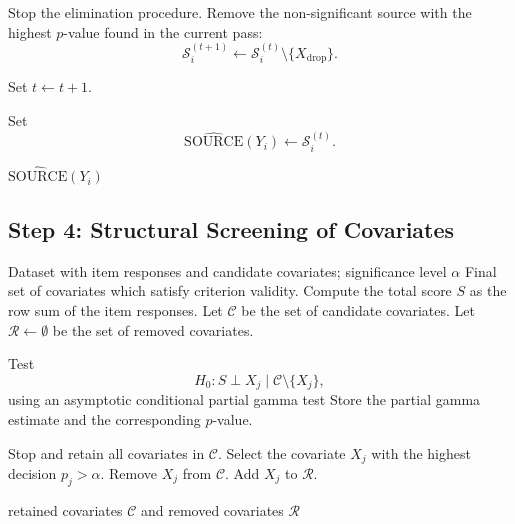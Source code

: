 \begin{breakablealgorithm}
\begin{algorithmic}[1]
    \EndFor

        \State Stop the elimination procedure.
    \Else
        \State Remove the non-significant source with the highest $p$-value found in the current pass:
        \[
        \mathcal{S}_i^{(t+1)}
        \gets
        \mathcal{S}_i^{(t)}
        \setminus
        \{X_{\mathrm{drop}}\}.
        \]

        \State Set $t \gets t+1$.
    \EndIf


\State Set
\[
\widehat{\mathrm{SOURCE}}(Y_i)
\gets
\mathcal{S}_i^{(t)} .
\]

\State \Return $\widehat{\mathrm{SOURCE}}(Y_i)$

\end{algorithmic}
\end{breakablealgorithm}

\subsection*{Step 4: Structural Screening of Covariates}
\begin{breakablealgorithm}
\caption{Step 4 structural screening}
\label{alg:step4}
\begin{algorithmic}[1]
\Require Dataset with item responses and candidate covariates;
significance level \(\alpha\)
\Ensure Final set of covariates which satisfy criterion validity.
\State Compute the total score \(S\) as the row sum of the item responses.
\State Let \(\mathcal{C}\) be the set of candidate covariates.
\State Let \(\mathcal{R} \gets \emptyset\) be the set of removed covariates.

        \State Test
        \[
            H_0: S \perp X_j \mid \mathcal{C} \setminus \{X_j\},
        \]
        using an asymptotic conditional partial gamma test
        \State Store the partial gamma estimate and the corresponding
        \(p\)-value.
    \EndFor

        \State Stop and retain all covariates in \(\mathcal{C}\).
    \Else
        \State Select the covariate \(X_j\) with the highest decision
        \(p_j > \alpha\).
        \State Remove \(X_j\) from \(\mathcal{C}\).
        \State Add \(X_j\) to \(\mathcal{R}\).
    \EndIf
\EndWhile

\State \Return retained covariates \(\mathcal{C}\) and removed covariates
\(\mathcal{R}\)
\end{algorithmic}
\end{breakablealgorithm}
